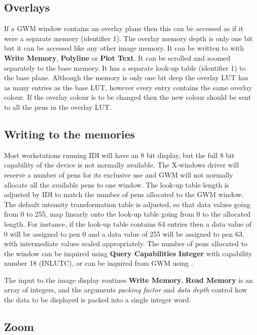 \subsection{Overlays}

If a GWM window contains an overlay plane then this can be accessed as
if it were a separate memory (identifier 1). The overlay memory depth
is only one bit but it can be accessed like any other image memory.
It can be written to with {\bf Write Memory}, {\bf Polyline} or
{\bf Plot Text}. It can be scrolled and zoomed separately to the base
memory. It has a separate look-up table (identifier 1) to the base
plane. Although the memory is only one bit deep the overlay LUT has as
many entries as the base LUT, however every entry contains the same
overlay colour. If the overlay colour is to be changed then the new
colour should be sent to all the pens in the overlay LUT.

\subsection{Writing to the memories}

Most workstations running IDI will have an 8 bit display, but the
full 8 bit capability of the device is not normally available. The
X-windows driver will reserve a number of pens for its exclusive use
and GWM will not normally allocate all the available pens to one
window. The look-up table length is adjusted by IDI to match the
number of pens allocated to the GWM window. The default intensity
transformation table is adjusted, so that data values going from 0 to
255, map linearly onto the look-up table going from 0 to the allocated
length. For instance, if the look-up table contains 64 entries then a data
value of 0 will be assigned to pen 0 and a data value of 255 will be assigned
to pen 63, with intermediate values scaled appropriately.
The number of pens allocated to the window can be inquired using
{\bf Query Capabilities Integer} with capability number 18 (INLUTC),
or can be inquired from GWM using .

The input to the image display routines {\bf Write Memory}, {\bf Read Memory}
is an array of integers, and the arguments {\it packing factor} and
{\it data depth} control how the data to be displayed is packed into a
single integer word.

\subsection{Zoom}

